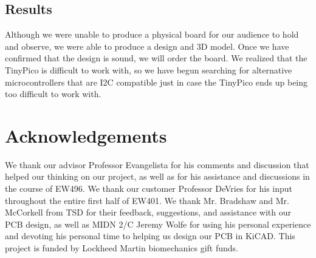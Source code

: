 \documentclass{article}
\begin{document}
\subsection{Results}
\par Although we were unable to produce a physical board for our audience to hold and observe, we were able to produce a design and 3D model. Once we have confirmed that the design is sound, we will order the board. We realized that the TinyPico is difficult to work with, so we have begun searching for alternative microcontrollers that are I2C compatible just in case the TinyPico ends up being too difficult to work with.

\section{Acknowledgements}
We thank our advisor Professor Evangelista for his comments and discussion that helped our thinking on our project, as well as for his assistance and discussions in the course of EW496. We thank our customer Professor DeVries for his input throughout the entire first half of EW401. We thank Mr. Bradshaw and Mr. McCorkell from TSD for their feedback, suggestions, and assistance with our PCB design, as well as MIDN 2/C Jeremy Wolfe for using his personal experience and devoting his personal time to helping us design our PCB in KiCAD. This project is funded by Lockheed Martin biomechanics gift funds. 



\end{document}

